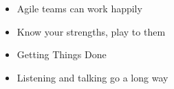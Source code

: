 
  \begin{itemize}
    \setlength\itemsep{-0.3em}
  
\item 
Agile teams can work happily 
% 
\item 
Know your strengths, play to them 
% 
\item 
Getting Things Done 
% 
\item 
Listening and talking go a long way 
% 
\end{itemize}
 
% 
% 
% 
% 


% 
% 
%   
